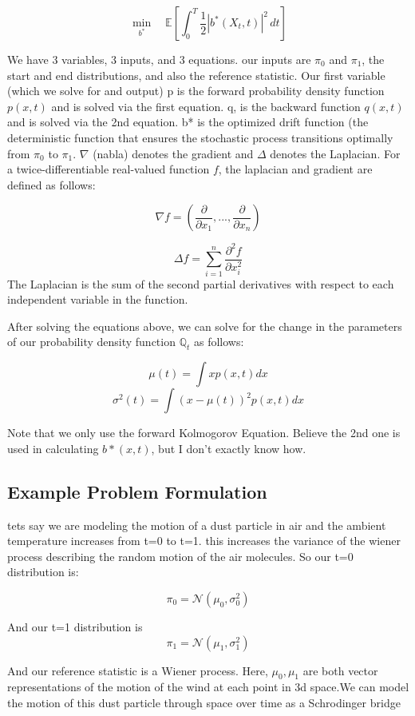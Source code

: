 \documentclass[12pt]{article}
\begin{document}
\[\underset{b^*}{\min}\quad \mathbb{E}\left[\int_0^T \frac{1}{2}|b^*(X_t, t)|^2\, dt\right]\]



We have 3 variables, 3 inputs, and 3 equations. our inputs are \(\pi_0\) and \(\pi_1\), the start and end distributions, and also the reference statistic. Our first variable (which we solve for and output) p is the forward probability density function \(p(x,t)\) and is solved via the first equation. q, is the backward function \(q(x,t)\) and is solved via the 2nd equation. b* is the optimized drift function (the deterministic function that ensures the stochastic process transitions optimally from \(\pi_0\) to \(\pi_1\). \(\nabla\) (nabla) denotes the gradient and \(\Delta\) denotes the Laplacian. For a twice-differentiable real-valued function \(f\), the laplacian and gradient are defined as follows:

\[\nabla f = \left(\frac{\partial}{\partial x_1}, ... , \frac{\partial}{\partial x_n}\right)\]

\[\Delta f = \sum_{i=1}^n\frac{\partial^2f}{\partial x_i^2}\]
The Laplacian is the sum of the second partial derivatives with respect to each independent variable in the function.

After solving the equations above, we can solve for the change in the parameters of our probability density function \(\mathbb{Q}_t\) as follows:

\[\mu(t) = \int x p(x,t)dx\]
\[\sigma^2(t)=\int(x - \mu(t))^2p(x,t)dx\]

Note that we only use the forward Kolmogorov Equation. Believe the 2nd one is used in calculating \(b*(x,t)\), but I don't exactly know how. 

\subsection{Example Problem Formulation}
tets say we are modeling the motion of a dust particle in air and the ambient temperature increases from t=0 to t=1. this increases the variance of the wiener process describing the random motion of the air molecules. So our t=0 distribution is:

\[\pi_0 = \mathcal{N}(\mu_0, \sigma_0^2)\]

And our t=1 distribution is 
\[\pi_1 = \mathcal{N}(\mu_1, \sigma_1^2)\]

And our reference statistic is a Wiener process. Here, \(\mu_0, \mu_1\) are both vector representations of the motion of the wind at each point in 3d space.We can model the motion of this dust particle through space over time as a Schrodinger bridge
\end{document}
